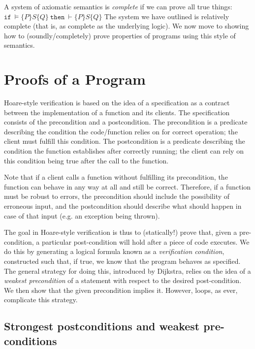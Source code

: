 \documentclass[11pt]{article}
\begin{document}
A system of axiomatic semantics is \emph{complete} if we can prove all true things: 
 $\mathtt{if}~\vDash \{ P \} S \{ Q \} ~ \mathtt{then}~\vdash \{ P \} S \{ Q \}
 $
%
The system we have outlined is relatively complete (that is, as complete as the
underlying logic). We now move to showing how to (soundly/completely) prove
properties of programs using this style of semantics.

\section{Proofs of a Program}

Hoare-style verification is based on the idea of a
specification as a contract between the implementation of a function and its
clients.  The specification consists of the precondition and a postcondition.
The precondition is a predicate describing the condition the code/function relies on
for correct operation; the client must fulfill this condition.  The
postcondition is a predicate describing the condition the function establishes
after correctly running; the client can rely on this condition being true after
the call to the function.

Note that if a client calls a function without fulfilling its precondition, the
function can behave in any way at all and still be correct.  Therefore, if
a function must be robust to errors, the precondition should include
the possibility of erroneous input, and the postcondition should describe what
should happen in case of that input (e.g. an exception being thrown).

The goal in Hoare-style verification is thus to (statically!) prove that, given
a pre-condition, a particular post-condition will hold after a piece of code
executes.  We do this by generating a logical formula known as a
\emph{verification condition}, constructed such that, if true, we know that the program
behaves as specified.  The general strategy for doing this, introduced by
Dijkstra, relies on the idea of a \emph{weakest precondition} of a statement
with respect to the desired post-condition.  We then show that the
given precondition implies it.  However, loops, as ever, complicate this
strategy.

\subsection{Strongest postconditions and weakest pre-conditions}
\end{document}

